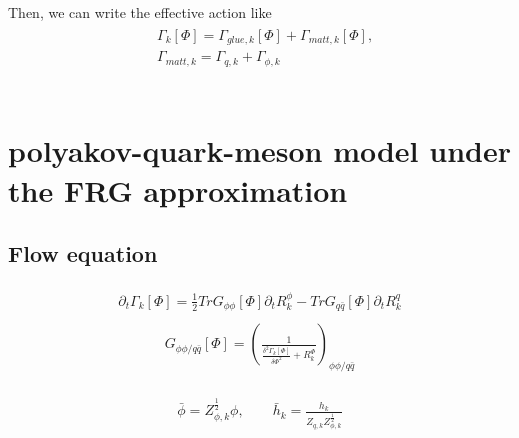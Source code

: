 \documentclass[%
reprint,
superscriptaddress,
showpacs,preprintnumbers,
 amsmath,amssymb,
 aps,
prd,
]{revtex4-1}
\begin{document}
Then, we can write the effective action like
\begin{align}
\begin{split}
&\Gamma_{k}[\Phi]=\Gamma_{glue,k}[\Phi]+\Gamma_{matt,k}[\Phi],\\
&\Gamma_{matt,k}=\Gamma_{q,k}+
\Gamma_{\phi,k}
\label{}
\end{split}
\end{align}\\



\section{polyakov-quark-meson model under the FRG approximation}







\subsection{Flow equation}

\begin{align}\label{fqm}
\begin{split}
\partial_t\Gamma_k[\Phi]=\frac{1}{2}TrG_{\phi\phi}[\Phi]\partial_tR^{\phi}_{k}-TrG_{q\bar{q}}[\Phi]\partial_tR^{q}_{k}
\end{split}
\end{align}
\begin{align}\label{cqm}
\begin{split}
G_{\phi\phi/q\bar{q}}[\Phi]=\left( \frac{1}{\frac{\delta^2\Gamma_k[\Phi]}{\delta\Phi^2}+R^{\Phi}_{k}} \right)_{\phi\phi/
q\bar{q}}
\end{split}
\end{align}

\begin{align}\label{}
\begin{split}
\bar{\phi}=Z^{\frac{1}{2}}_{\phi,k}\phi ,\qquad \bar{h}_k=\frac{h_k}{Z_{q,k}Z^{\frac{1}{2}}_{\phi,k}}
\end{split}
\end{align}



\end{document}
